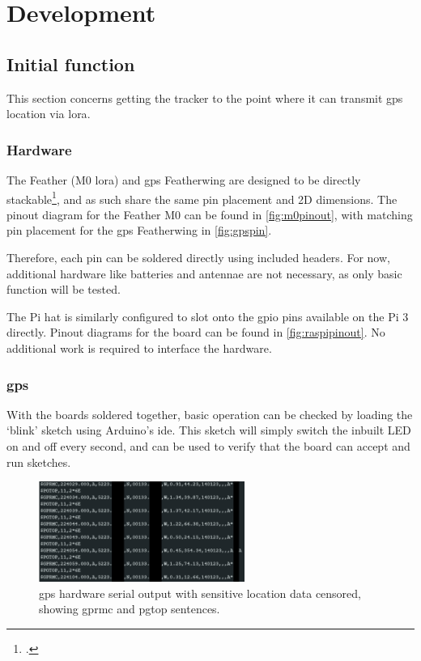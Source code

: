 \section{Development}
\subsection{Initial function}
This section concerns getting the tracker to the point where it can transmit \acrshort{gps} location 
via \gls{lora}.
\subsubsection{Hardware}
The Feather (M0 \gls{lora}) and \acrshort{gps} Featherwing are designed to
be directly stackable\footnote{
    .
}, and as such share the same pin placement and 2D dimensions. 
The pinout diagram for the Feather M0 can be found 
in \cref{fig:m0pinout}, with matching pin placement for the \acrshort{gps} Featherwing 
in \cref{fig:gpspin}.

Therefore, each pin can be soldered directly using included headers.
For now, additional hardware like batteries and antennae are not necessary, as only
basic function will be tested. 

The Pi \acrshort{hat} is similarly configured to slot onto the \acrshort{gpio} pins
available on the Pi 3 directly. Pinout diagrams for the board can be 
found in \cref{fig:raspipinout}. No additional work is required to interface the hardware.

\subsubsection{\acrshort{gps}}
\label{sec:devgps}
With the boards soldered together, basic operation can be checked 
by loading the `blink' sketch \cite{arduino:blink} using Arduino's \acrshort{ide}.
This sketch will simply switch the inbuilt LED on and off every second, and can be used to verify that
the board can accept and run sketches.

\begin{figure}
    \vspace{-5pt}
    \centering
    \captionsetup{justification=centering}
    \includegraphics[width=0.6\textwidth]{../figures/hardwareserialoutput.png}
    \caption[GPS hardware serial output]{\acrshort{gps} hardware serial output with sensitive location data censored,
        showing \gls{gprmc} and \gls{pgtop} sentences.}
    \label{fig:gpshardwareserial}
\end{figure}


